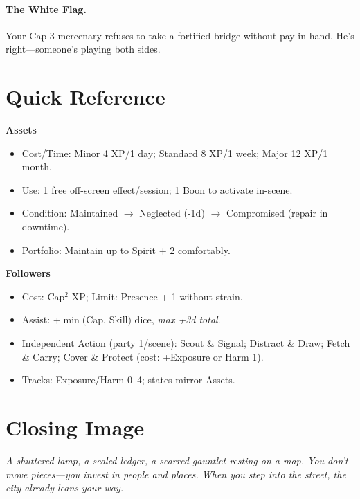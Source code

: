 \begin{multicols}{2}
\paragraph{The White Flag.}
Your Cap 3 mercenary refuses to take a fortified bridge without pay in hand. He’s right—someone’s playing both sides.

\section*{Quick Reference}
\begin{tcolorbox}[colback=blue!5!white,colframe=blue!75!black,title=Assets \& Followers Quick Reference,fonttitle=\bfseries]
\textbf{Assets}
\begin{itemize}
  \item Cost/Time: Minor 4 XP/1 day; Standard 8 XP/1 week; Major 12 XP/1 month.
  \item Use: 1 free off-screen effect/session; 1 Boon to activate in-scene.
  \item Condition: Maintained \(\rightarrow\) Neglected (-1d) \(\rightarrow\) Compromised (repair in downtime).
  \item Portfolio: Maintain up to Spirit + 2 comfortably.
\end{itemize}

\textbf{Followers}
\begin{itemize}
  \item Cost: Cap\(^2\) XP; Limit: Presence + 1 without strain.
  \item Assist: +\(\min(\)Cap, Skill\()\) dice, \textit{max +3d total}.
  \item Independent Action (party 1/scene): Scout \& Signal; Distract \& Draw; Fetch \& Carry; Cover \& Protect (cost: +Exposure or Harm 1).
  \item Tracks: Exposure/Harm 0–4; states mirror Assets.
\end{itemize}
\end{tcolorbox}

\section*{Closing Image}
\textit{A shuttered lamp, a sealed ledger, a scarred gauntlet resting on a map. You don’t move pieces—you invest in people and places. When you step into the street, the city already leans your way.}

\end{multicols}



